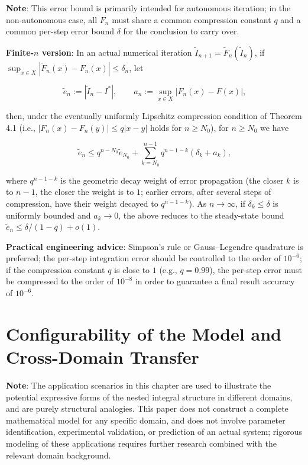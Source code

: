 \documentclass[11pt,a4paper]{amsart}
\begin{document}
\textbf{Note}: This error bound is primarily intended for autonomous iteration; in the non-autonomous case, all $F_n$ must share a common compression constant $q$ and a common per-step error bound $\delta$ for the conclusion to carry over.

\textbf{Finite-$n$ version}: In an actual numerical iteration $\widetilde{I}_{n+1} = \widetilde{F}_n(\widetilde{I}_n)$, if $\sup_{x\in X}|\widetilde{F}_n(x) - F_n(x)| \le \delta_n$, let

\begin{equation}
\label{eq:etilde-def}
\widetilde{e}_n := |\widetilde{I}_n - I^*|, \qquad a_n := \sup_{x\in X}|F_n(x) - F(x)|,
\end{equation}

then, under the eventually uniformly Lipschitz compression condition of Theorem 4.1 (i.e., $|F_n(x) - F_n(y)| \le q|x-y|$ holds for $n \ge N_0$), for $n \ge N_0$ we have

\begin{equation}
\label{eq:finite-n-error}
\widetilde{e}_n \le q^{n-N_0}\widetilde{e}_{N_0} + \sum_{k=N_0}^{n-1} q^{n-1-k}(\delta_k + a_k),
\end{equation}

where $q^{n-1-k}$ is the geometric decay weight of error propagation (the closer $k$ is to $n-1$, the closer the weight is to $1$; earlier errors, after several steps of compression, have their weight decayed to $q^{n-1-k}$). As $n \to \infty$, if $\delta_k \le \delta$ is uniformly bounded and $a_k \to 0$, the above reduces to the steady-state bound $\widetilde{e}_n \le \delta/(1-q) + o(1)$.

\textbf{Practical engineering advice}: Simpson's rule or Gauss--Legendre quadrature is preferred; the per-step integration error should be controlled to the order of $10^{-6}$; if the compression constant $q$ is close to $1$ (e.g., $q = 0.99$), the per-step error must be compressed to the order of $10^{-8}$ in order to guarantee a final result accuracy of $10^{-6}$.

\section{Configurability of the Model and Cross-Domain Transfer}

\textbf{Note}: The application scenarios in this chapter are used to illustrate the potential expressive forms of the nested integral structure in different domains, and are purely structural analogies. This paper does not construct a complete mathematical model for any specific domain, and does not involve parameter identification, experimental validation, or prediction of an actual system; rigorous modeling of these applications requires further research combined with the relevant domain background.
\end{document}
